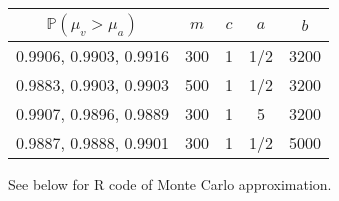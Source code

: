 \documentclass{article}
\begin{document}
\begin{enumerate}
\begin{center}
\begin{tabular}{c || c | c | c | c}
$\mathds{P}(\mu_v > \mu_a) $ & $m$ & $c$ & $a$ & $b$ \\ \hline
0.9906, 0.9903, 0.9916 & 300 & 1 & 1/2 & 3200 \\
0.9883, 0.9903, 0.9903 & 500 & 1 & 1/2 & 3200 \\
0.9907, 0.9896, 0.9889 & 300 & 1 & 5 & 3200 \\
0.9887, 0.9888, 0.9901 & 300 & 1 & 1/2 & 5000
\end{tabular}
\end{center}

\end{enumerate}

\pagebreak

See below for R code of Monte Carlo approximation.

\end{document}
